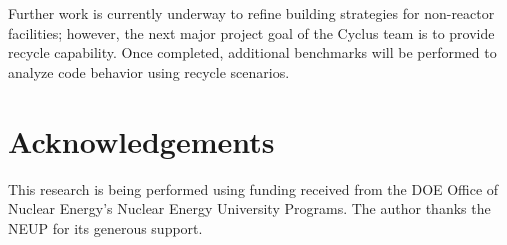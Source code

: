 \documentclass{anstrans}
\begin{document}
Further work is currently underway to refine building strategies for
non-reactor facilities; however, the next major project goal of the
Cyclus team is to provide recycle capability. Once completed,
additional benchmarks will be performed to analyze code behavior using
recycle scenarios.
\section{Acknowledgements}
This research is being performed using funding received from the DOE
Office of Nuclear Energy's Nuclear Energy University Programs.  The
author thanks the NEUP for its generous support.

\end{document}
